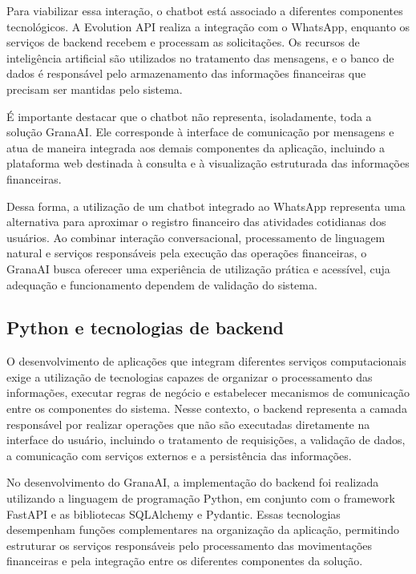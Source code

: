 Para viabilizar essa interação, o chatbot está associado a diferentes componentes tecnológicos. A Evolution API realiza a integração com o WhatsApp, enquanto os serviços de backend recebem e processam as solicitações. Os recursos de inteligência artificial são utilizados no tratamento das mensagens, e o banco de dados é responsável pelo armazenamento das informações financeiras que precisam ser mantidas pelo sistema.

É importante destacar que o chatbot não representa, isoladamente, toda a solução GranaAI. Ele corresponde à interface de comunicação por mensagens e atua de maneira integrada aos demais componentes da aplicação, incluindo a plataforma web destinada à consulta e à visualização estruturada das informações financeiras.

Dessa forma, a utilização de um chatbot integrado ao WhatsApp representa uma alternativa para aproximar o registro financeiro das atividades cotidianas dos usuários. Ao combinar interação conversacional, processamento de linguagem natural e serviços responsáveis pela execução das operações financeiras, o GranaAI busca oferecer uma experiência de utilização prática e acessível, cuja adequação e funcionamento dependem de validação do sistema.

\subsection{Python e tecnologias de backend}

O desenvolvimento de aplicações que integram diferentes serviços computacionais exige a utilização de tecnologias capazes de organizar o processamento das informações, executar regras de negócio e estabelecer mecanismos de comunicação entre os componentes do sistema. Nesse contexto, o backend representa a camada responsável por realizar operações que não são executadas diretamente na interface do usuário, incluindo o tratamento de requisições, a validação de dados, a comunicação com serviços externos e a persistência das informações.

No desenvolvimento do GranaAI, a implementação do backend foi realizada utilizando a linguagem de programação Python, em conjunto com o framework FastAPI e as bibliotecas SQLAlchemy e Pydantic. Essas tecnologias desempenham funções complementares na organização da aplicação, permitindo estruturar os serviços responsáveis pelo processamento das movimentações financeiras e pela integração entre os diferentes componentes da solução.

